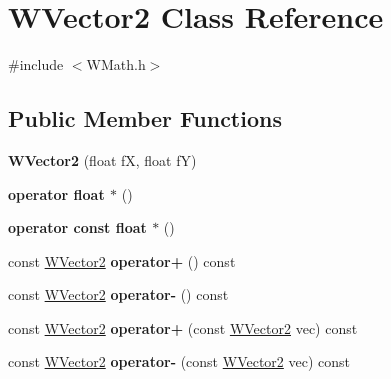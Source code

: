 \hypertarget{class_w_vector2}{}\section{W\+Vector2 Class Reference}
\label{class_w_vector2}


{\ttfamily \#include $<$W\+Math.\+h$>$}

\subsection*{Public Member Functions}
\begin{DoxyCompactItemize}
\item 
{\bfseries W\+Vector2} (float fX, float fY)\hypertarget{class_w_vector2_a8a79efe5e621a657e6ddc9374473e814}{}\label{class_w_vector2_a8a79efe5e621a657e6ddc9374473e814}

\item 
{\bfseries operator float $\ast$} ()\hypertarget{class_w_vector2_aef6b839b41a647bd8d14d5317b82aedf}{}\label{class_w_vector2_aef6b839b41a647bd8d14d5317b82aedf}

\item 
{\bfseries operator const float $\ast$} ()\hypertarget{class_w_vector2_a3df26f0349013a145971833aa7b38c8c}{}\label{class_w_vector2_a3df26f0349013a145971833aa7b38c8c}

\item 
const \hyperlink{class_w_vector2}{W\+Vector2} {\bfseries operator+} () const \hypertarget{class_w_vector2_a0aa3a700d45f94925ca776f03c407139}{}\label{class_w_vector2_a0aa3a700d45f94925ca776f03c407139}

\item 
const \hyperlink{class_w_vector2}{W\+Vector2} {\bfseries operator-\/} () const \hypertarget{class_w_vector2_af0b30808c2a6fd7e724e12f5c40c126f}{}\label{class_w_vector2_af0b30808c2a6fd7e724e12f5c40c126f}

\item 
const \hyperlink{class_w_vector2}{W\+Vector2} {\bfseries operator+} (const \hyperlink{class_w_vector2}{W\+Vector2} vec) const \hypertarget{class_w_vector2_adb8a15e118624312c87bbe58f2ac58f4}{}\label{class_w_vector2_adb8a15e118624312c87bbe58f2ac58f4}

\item 
const \hyperlink{class_w_vector2}{W\+Vector2} {\bfseries operator-\/} (const \hyperlink{class_w_vector2}{W\+Vector2} vec) const \hypertarget{class_w_vector2_a71e49c9d78885fc11a727572748f2915}{}\label{class_w_vector2_a71e49c9d78885fc11a727572748f2915}


\end{DoxyCompactItemize}
